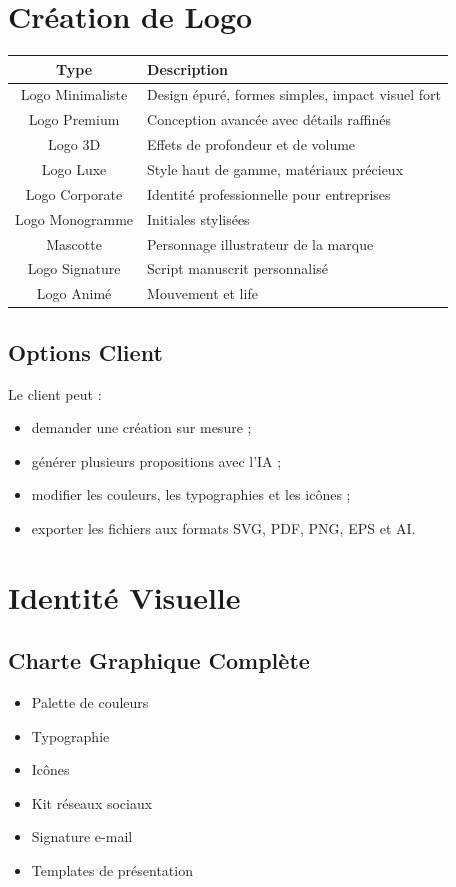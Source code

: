 \documentclass[12pt,a4paper,oneside]{book}
\begin{document}
\section{Création de Logo}
\bigskip
\begin{center}
\begin{tabular}{|c|p{10cm}|}
\hline
\rowcolor{electronblue}
\color{white}\textbf{Type} & \color{white}\textbf{Description} \\
\hline
Logo Minimaliste & Design épuré, formes simples, impact visuel fort \\
\hline
Logo Premium & Conception avancée avec détails raffinés \\
\hline
Logo 3D & Effets de profondeur et de volume \\
\hline
Logo Luxe & Style haut de gamme, matériaux précieux \\
\hline
Logo Corporate & Identité professionnelle pour entreprises \\
\hline
Logo Monogramme & Initiales stylisées \\
\hline
Mascotte & Personnage illustrateur de la marque \\
\hline
Logo Signature & Script manuscrit personnalisé \\
\hline
Logo Animé & Mouvement et life \\
\hline
\end{tabular}
\end{center}

\subsection{Options Client}
Le client peut :
\begin{itemize}
\item demander une création sur mesure ;
\item générer plusieurs propositions avec l'IA ;
\item modifier les couleurs, les typographies et les icônes ;
\item exporter les fichiers aux formats SVG, PDF, PNG, EPS et AI.
\end{itemize}

\section{Identité Visuelle}
\subsection{Charte Graphique Complète}
\begin{itemize}
\item Palette de couleurs
\item Typographie
\item Icônes
\item Kit réseaux sociaux
\item Signature e-mail
\item Templates de présentation
\end{itemize}
\end{document}
